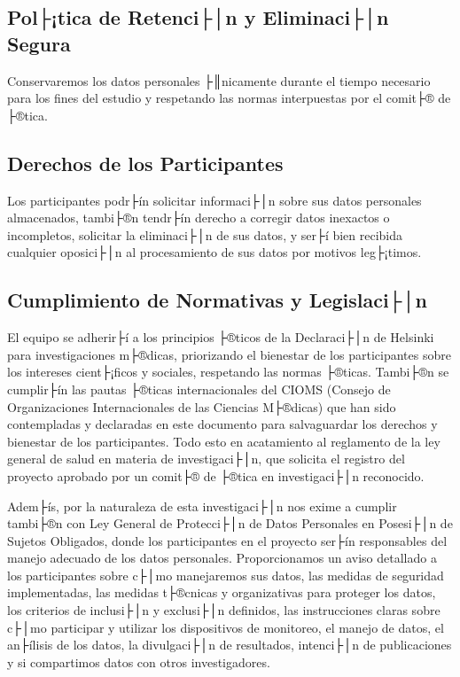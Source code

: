 \subsection{Pol├¡tica de Retenci├│n y Eliminaci├│n Segura}
\label{subsec:politica_retencion}

Conservaremos los datos personales ├║nicamente durante el tiempo necesario para los fines del estudio y respetando las normas interpuestas por el comit├® de ├®tica.

\subsection{Derechos de los Participantes}
\label{subsec:derechos_participantes}

Los participantes podr├ín solicitar informaci├│n sobre sus datos personales almacenados, tambi├®n tendr├ín derecho a corregir datos inexactos o incompletos, solicitar la eliminaci├│n de sus datos, y ser├í bien recibida cualquier oposici├│n al procesamiento de sus datos por motivos leg├¡timos.

\subsection{Cumplimiento de Normativas y Legislaci├│n}
\label{subsec:cumplimiento_normativas}

El equipo se adherir├í a los principios ├®ticos de la Declaraci├│n de Helsinki para investigaciones m├®dicas, priorizando el bienestar de los participantes sobre los intereses cient├¡ficos y sociales, respetando las normas ├®ticas. Tambi├®n se cumplir├ín las pautas ├®ticas internacionales del CIOMS (Consejo de Organizaciones Internacionales de las Ciencias M├®dicas) que han sido contempladas y declaradas en este documento para salvaguardar los derechos y bienestar de los participantes. Todo esto en acatamiento al reglamento de la ley general de salud en materia de investigaci├│n, que solicita el registro del proyecto aprobado por un comit├® de ├®tica en investigaci├│n reconocido.

Adem├ís, por la naturaleza de esta investigaci├│n nos exime a cumplir tambi├®n con Ley General de Protecci├│n de Datos Personales en Posesi├│n de Sujetos Obligados, donde los participantes en el proyecto ser├ín responsables del manejo adecuado de los datos personales. Proporcionamos un aviso detallado a los participantes sobre c├│mo manejaremos sus datos, las medidas de seguridad implementadas, las medidas t├®cnicas y organizativas para proteger los datos, los criterios de inclusi├│n y exclusi├│n definidos, las instrucciones claras sobre c├│mo participar y utilizar los dispositivos de monitoreo, el manejo de datos, el an├ílisis de los datos, la divulgaci├│n de resultados, intenci├│n de publicaciones y si compartimos datos con otros investigadores.

